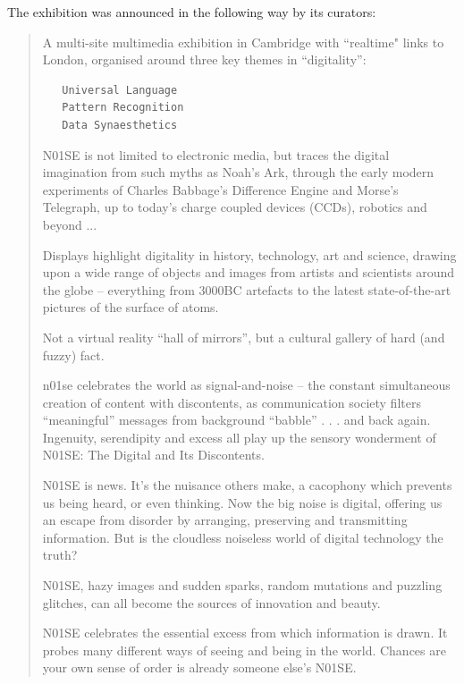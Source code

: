 The exhibition was announced in the following way by its curators: 
\begin{quotation}
A multi-site multimedia exhibition in Cambridge with ``realtime" links to London, organised around three key themes in ``digitality'':

\begin{verbatim}
   Universal Language 
   Pattern Recognition 
   Data Synaesthetics
\end{verbatim} 

N01SE is not limited to electronic media, but traces the digital imagination from such myths as Noah's Ark, through the early modern experiments of Charles Babbage's Difference Engine and Morse's Telegraph, up to today's charge coupled devices (CCDs), robotics and beyond ...

Displays highlight digitality in history, technology, art and science, drawing upon a wide range of objects and images from artists and scientists around the globe -- everything from 3000BC artefacts to the latest state-of-the-art pictures of the surface of atoms. 

Not a virtual reality ``hall of mirrors'', but a cultural gallery of hard (and fuzzy) fact.

n01se celebrates the world as signal-and-noise -- the constant simultaneous creation of content with discontents, as communication society filters ``meaningful'' messages from background ``babble'' . . . and back again. Ingenuity, serendipity and excess all play up the sensory wonderment of N01SE: The Digital and Its Discontents.

N01SE is news. It's the nuisance others make, a cacophony which prevents us being heard, or even thinking. 
Now the big noise is digital, offering us an escape from disorder by arranging, preserving and transmitting 
information. But is the cloudless noiseless world of digital technology the truth? 

N01SE, hazy images and sudden sparks, random mutations and puzzling glitches, can all become the sources of innovation 
and beauty. 

\newpage

N01SE celebrates the essential excess from which information is drawn. It probes many different ways of seeing and 
being in the world. Chances are your own sense of order is already someone else's N01SE.
\end{quotation}

